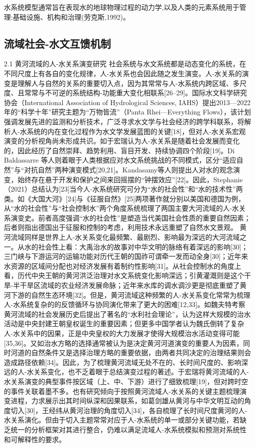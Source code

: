 水系统模型通常旨在表现水的地球物理过程的动力学,以及人类的元素系统用于管理:基础设施、机构和治理(劳克斯,1992)。

\subsection{流域社会-水文互馈机制}

2.1 黄河流域的人-水关系演变研究
社会系统与水文系统都是动态变化的系统，在不同尺度上有各自的变化规律，人-水关系也会因此随之发生演变。人-水关系的演变是理解人与自然的关系的重要切入点，因为其常常与人-水系统内跨区域、多尺度、且常常与不可逆的系统结构-功能重大变化相联系[26–29]。国际水文科学研究协会（International Association of Hydrological Sciences, IAHS）提出2013—2022年的“科学十年”研究主题为“万物皆流”（Panta Rhei—Everything Flows），该计划强调发展先进的监测和分析技术，广泛寻求水文学与社会经济的跨学科联系，将解析人-水系统的内在变化过程作为水文学发展蓝图的关键[18]，但对人-水关系宏观演变的分析视角尚未形成共识。如于宏瑞认为人-水关系是随着社会发展而变化的，因此经历了自然崇拜、趋势利用、盲目开发、持续协调四个阶段[19]。Di Baldassarre 等人则着眼于人类根据应对水文系统挑战的不同模式，区分“适应自然”与“对抗自然”两种演变模式[20,21]。Kandasamy等人则提出人对水的观念演变，始终存在悬于开发和保护之间来回摇摆的“钟摆效应”[22]。因此，Stephanie（2021）总结认为[23]当今人-水系统研究可分为“水的社会性”和“水的技术性”两类。如《大国大河》[24]与《征服自然》[25]两项著作就分别以美国和德国为例，从“水的社会性”与“社会控制水”两个角度系统梳理了两国主要大河流域的人-水关系演变史。前者高度强调“水的社会性”是塑造当代美国社会性质的重要自然因素；后者则指出德国出于征服和控制的考虑，利用技术永远重塑了自然水文景观。
黄河流域同样是世界上人-水关系变化最频繁、最剧烈、影响最为深远的大河流域之一。从水的社会性上看：大禹治水的故事对中华文明的脉络有着深远的影响[30]；三门峡与下游运河的运输功能对历代王朝的国祚可谓牵一发而动全身[30]；近年来水资源的区域间分配也对经济发展有着制约性影响[31]。从社会控制水的角度上看，历代中央王朝的黄河洪泛治理对水文系统变化影响深远；引黄灌溉则是这个干旱-半干旱区流域的农业经济发展命脉；近年来水库的调水调沙更是彻底重塑了黄河下游的自然生态环境[32]。但是，黄河流域这种频繁的人-水关系变化常常为梳理人-水系统复杂的的反馈循环与协同演化带来了更大的困难[12,33]。如魏夫特考察黄河流域的社会发展历史后提出了著名的“水利社会理论”，认为这样大规模的治水活动是中央封建王朝皇权诞生的重要因素；但更多中国学者认为魏氏倒转了复杂人-水关系中的因果，正是中央皇权的大力发展才使得大规模治水活动变得可能[35,36]。又如治水方略的选择通常被认为是决定黄河河道演变的重要人为因素，同时河道的自然条件又是选择治理方略的重要依据，由两者共同决定的治理结果则会造成路径依赖[34]。因此，为了梳理黄河流域无处不在的、长时间尺度的、影响深远的人-水关系变化，也不乏着眼于总结演变过程的著述。于宏瑞将黄河流域的人-水关系演变的典型事件按区域（上、中、下游）进行了细致梳理[19]，但对跨时空的事件关联着墨不多。也有研究倾向于按照黄河流域人-水关系的关键主题梳理演变进程，力求展示出其时间纵深和因果联系，如葛剑雄从黄河与中华文明互动的角度切入[30]，王经纬从黄河治理的角度切入[34]，各自梳理了长时间尺度黄河的人-水关系演化。但由于切入主题常常对应于人-水系统的单一或部分关键功能，若缺乏统一的分析框架对其进行整合，仍难以满足流域人-水系统模拟和预测对系统性和可解释性的要求。
